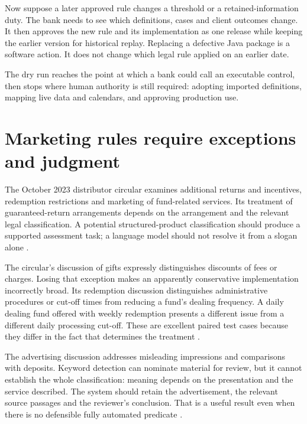 Now suppose a later approved rule changes a threshold or a retained-information
duty. The bank needs to see which definitions, cases and client outcomes change.
It then approves the new rule and its implementation as one release while
keeping the earlier version for historical replay. Replacing a defective Java
package is a software action. It does not change which legal rule applied on an
earlier date.

The dry run reaches the point at which a bank could call an executable control,
then stops where human authority is still required: adopting imported
 definitions, mapping live data and calendars, and approving production use.

\section{Marketing rules require exceptions and judgment}
\label{merge:P-01-problem:04}


The October 2023 distributor circular examines additional returns and incentives,
redemption restrictions and marketing of fund-related services. Its treatment of
guaranteed-return arrangements depends on the arrangement and the relevant legal
classification. A potential structured-product classification should produce a
supported assessment task; a language model should not resolve it from a slogan
alone \citep[paras.~5--11]{sfcmarketing}.

The circular's discussion of gifts expressly distinguishes discounts of fees or
charges. Losing that exception makes an apparently conservative implementation
incorrectly broad. Its redemption discussion distinguishes administrative
procedures or cut-off times from reducing a fund's dealing frequency. A daily
dealing fund offered with weekly redemption presents a different issue from a
different daily processing cut-off. These are excellent paired test cases because
they differ in the fact that determines the treatment
\citep[paras.~9--14]{sfcmarketing}.

The advertising discussion addresses misleading impressions and comparisons with
deposits. Keyword detection can nominate material for review, but it cannot
establish the whole classification: meaning depends on the presentation and the
service described. The system should retain the advertisement, the relevant
source passages and the reviewer's conclusion. That is a useful result even when
there is no defensible fully automated predicate
\citep[paras.~15--17]{sfcmarketing}.

